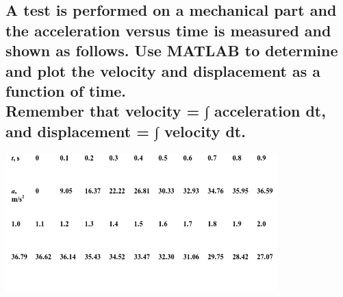 \documentclass[12pt,a4paper]{article}
\begin{document}
\subsection{A test is performed on a mechanical part and the acceleration versus time is measured and shown as follows. Use MATLAB to determine and plot the velocity and displacement as a function of time.\\Remember that velocity = ∫ acceleration dt, and displacement = ∫ velocity dt.}

\includegraphics[width = \textwidth]{screenshot001.png}
\end{document}
